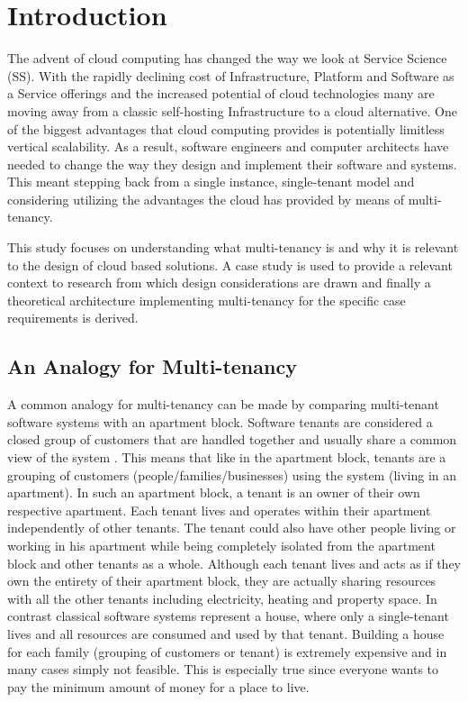 \chapter{Introduction}
The advent of cloud computing  has changed the way we look at Service Science (SS). With the rapidly declining cost of Infrastructure, Platform and Software as a Service offerings and the increased potential of cloud technologies many are moving away from a classic self-hosting Infrastructure to a cloud alternative. One of the biggest advantages that cloud computing provides is potentially limitless vertical scalability. As a result, software engineers and computer architects have needed to change the way they design and implement their software and systems. This meant stepping back from a single instance, single-tenant model and considering utilizing the advantages the cloud has provided by means of multi-tenancy.
 
This study focuses on understanding what multi-tenancy is and why it is relevant to the design of cloud based solutions. A case study is used to provide a relevant context to research from which design considerations are drawn and finally a theoretical architecture implementing multi-tenancy for the specific case requirements is derived.


\section{An Analogy for Multi-tenancy}

A common analogy for multi-tenancy can be made by comparing multi-tenant software systems with an apartment block. Software tenants are considered a closed group of customers that are handled together and usually share a common view of the system \cite{Krebs2012} \cite{Wilder2012-so}. This means that like in the apartment block, tenants are a grouping of customers (people/families/businesses) using the system (living in an apartment). In such an apartment block, a tenant is an owner of their own respective apartment. Each tenant lives and operates within their apartment independently of other tenants. The tenant could also have other people living or working in his apartment while being completely isolated from the apartment block and other tenants as a whole. Although each tenant lives and acts as if they own the entirety of their apartment block, they are actually sharing resources with all the other tenants including electricity, heating and property space. In contrast classical software systems represent a house, where only a single-tenant lives and all resources are consumed and used by that tenant. Building a house for each family (grouping of customers or tenant) is extremely expensive and in many cases simply not feasible. This is especially true since everyone wants to pay the minimum amount of money for a place to live.
 
